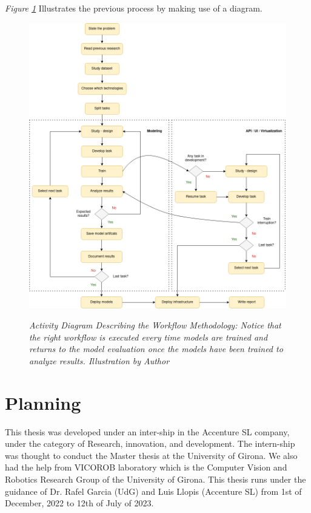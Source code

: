 \textit{Figure \ref{fig:flux_development}} Illustrates the previous process by making use of a diagram.

\newpage


\begin{figure}[H]
\centering
\includegraphics[width=\textwidth]{imatges/planing_and_methodology/EmplyedMethodology.png}
\caption[Activity Diagram Describing the Methodology.]{\textit{Activity Diagram Describing the Workflow Methodology: Notice that the right workflow is executed every time models are trained and returns to the model evaluation once the models have been trained to analyze results. Illustration by Author}}
{\label{fig:flux_development}}
\end{figure}


\newpage


\section{Planning}

This thesis was developed under an inter-ship in the Accenture SL company, under the category of Research, innovation, and development. The intern-ship was thought to conduct the Master thesis at the University of Girona. We also had the help from VICOROB laboratory which is the Computer Vision and Robotics Research Group of the University of Girona. This thesis runs under the guidance of Dr. Rafel Garcia (UdG) and Luis Llopis (Accenture SL) from 1st of December, 2022 to 12th of July of 2023. \\

